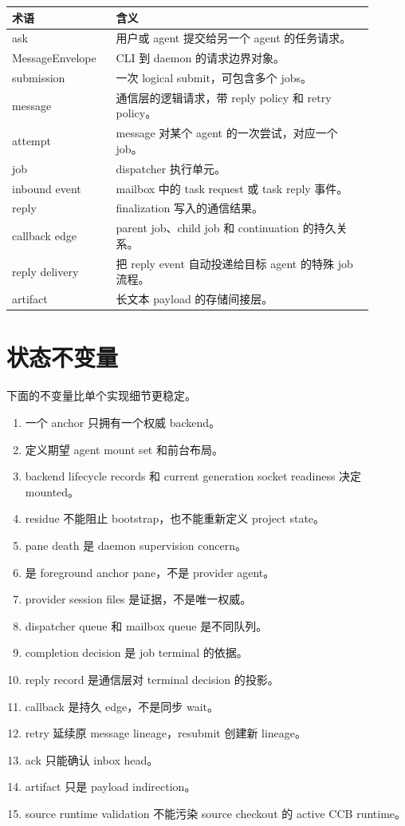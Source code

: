 \begin{longtable}{p{0.25\linewidth}p{0.65\linewidth}}
\toprule
术语 & 含义 \\
\midrule
ask & 用户或 agent 提交给另一个 agent 的任务请求。 \\
MessageEnvelope & CLI 到 daemon 的请求边界对象。 \\
submission & 一次 logical submit，可包含多个 jobs。 \\
message & 通信层的逻辑请求，带 reply policy 和 retry policy。 \\
attempt & message 对某个 agent 的一次尝试，对应一个 job。 \\
job & dispatcher 执行单元。 \\
inbound event & mailbox 中的 task request 或 task reply 事件。 \\
reply & finalization 写入的通信结果。 \\
callback edge & parent job、child job 和 continuation 的持久关系。 \\
reply delivery & 把 reply event 自动投递给目标 agent 的特殊 job 流程。 \\
artifact & 长文本 payload 的存储间接层。 \\
\bottomrule
\end{longtable}

\section{状态不变量}

下面的不变量比单个实现细节更稳定。

\begin{enumerate}
  \item 一个  anchor 只拥有一个权威 backend。
  \item {} 定义期望 agent mount set 和前台布局。
  \item backend lifecycle records 和 current generation socket readiness 决定 mounted。
  \item residue 不能阻止 bootstrap，也不能重新定义 project state。
  \item pane death 是 daemon supervision concern。
  \item {} 是 foreground anchor pane，不是 provider agent。
  \item provider session files 是证据，不是唯一权威。
  \item dispatcher queue 和 mailbox queue 是不同队列。
  \item completion decision 是 job terminal 的依据。
  \item reply record 是通信层对 terminal decision 的投影。
  \item callback 是持久 edge，不是同步 wait。
  \item retry 延续原 message lineage，resubmit 创建新 lineage。
  \item ack 只能确认 inbox head。
  \item artifact 只是 payload indirection。
  \item source runtime validation 不能污染 source checkout 的 active CCB runtime。
\end{enumerate}

